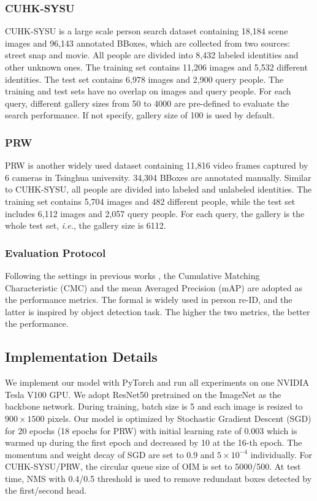 \documentclass[letterpaper]{article} \usepackage{aaai21}  \usepackage{times}  \usepackage{helvet} \usepackage{courier}  \usepackage[hyphens]{url}  \usepackage{graphicx} \urlstyle{rm} \def\UrlFont{\rm}  \usepackage{natbib}  \usepackage{caption} \usepackage{multirow}
\begin{document}
\subsubsection{CUHK-SYSU}
CUHK-SYSU \cite{oim} is a large scale person search dataset containing 18,184 scene images and 96,143 annotated BBoxes, which are collected from two sources: street snap and movie. All people are divided into 8,432 labeled identities and other unknown ones. The training set contains 11,206 images and 5,532 different identities. The test set contains 6,978 images and 2,900 query people. The training and test sets have no overlap on images and query people. For each query, different gallery sizes from 50 to 4000 are pre-defined to evaluate the search performance. If not specify, gallery size of 100 is used by default.

\subsubsection{PRW}
PRW is another widely used dataset \cite{prw} containing 11,816 video frames captured by 6 cameras in Tsinghua university. 34,304 BBoxes are annotated manually. Similar to CUHK-SYSU, all people are divided into labeled and unlabeled identities. The training set contains 5,704 images and 482 different people, while the test set includes 6,112 images and 2,057 query people. For each query, the gallery is the whole test set, \textit{i.e.}, the gallery size is 6112.

\subsubsection{Evaluation Protocol}
Following the settings in previous works \cite{qeeps,nae}, the Cumulative Matching Characteristic (CMC) and the mean Averaged Precision (mAP) are adopted as the performance metrics. The formal is widely used in person re-ID, and the latter is inspired by object detection task. The higher the two metrics, the better the performance.

\subsection{Implementation Details}
We implement our model with PyTorch \cite{pytorch} and run all experiments on one NVIDIA Tesla V100 GPU. We adopt ResNet50 \cite{resnet} pretrained on the ImageNet \cite{imagenet} as the backbone network. During training, batch size is 5 and each image is resized to $900\times1500$ pixels. Our model is optimized by Stochastic Gradient Descent (SGD) for 20 epochs (18 epochs for PRW) with initial learning rate of 0.003 which is warmed up during the first epoch and decreased by 10 at the 16-th epoch. The momentum and weight decay of SGD are set to 0.9 and $5\times10^{-4}$ individually. For CUHK-SYSU/PRW, the circular queue size of OIM is set to 5000/500. At test time, NMS with 0.4/0.5 threshold is used to remove redundant boxes detected by the first/second head.
\end{document}
